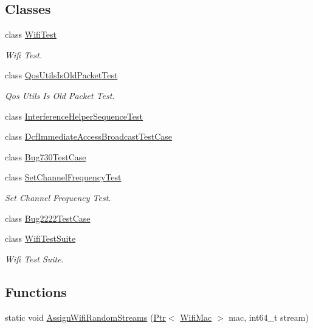 \subsection*{Classes}
\begin{DoxyCompactItemize}
\item 
class \hyperlink{classWifiTest}{Wifi\+Test}
\begin{DoxyCompactList}\small\item\em Wifi Test. \end{DoxyCompactList}\item 
class \hyperlink{classQosUtilsIsOldPacketTest}{Qos\+Utils\+Is\+Old\+Packet\+Test}
\begin{DoxyCompactList}\small\item\em Qos Utils Is Old Packet Test. \end{DoxyCompactList}\item 
class \hyperlink{classInterferenceHelperSequenceTest}{Interference\+Helper\+Sequence\+Test}
\item 
class \hyperlink{classDcfImmediateAccessBroadcastTestCase}{Dcf\+Immediate\+Access\+Broadcast\+Test\+Case}
\item 
class \hyperlink{classBug730TestCase}{Bug730\+Test\+Case}
\item 
class \hyperlink{classSetChannelFrequencyTest}{Set\+Channel\+Frequency\+Test}
\begin{DoxyCompactList}\small\item\em Set Channel Frequency Test. \end{DoxyCompactList}\item 
class \hyperlink{classBug2222TestCase}{Bug2222\+Test\+Case}
\item 
class \hyperlink{classWifiTestSuite}{Wifi\+Test\+Suite}
\begin{DoxyCompactList}\small\item\em Wifi Test Suite. \end{DoxyCompactList}\end{DoxyCompactItemize}
\subsection*{Functions}
\begin{DoxyCompactItemize}
\item 
static void \hyperlink{wifi-test_8cc_a27e1dfc9840ff9d220527fa04cbd65de}{Assign\+Wifi\+Random\+Streams} (\hyperlink{classns3_1_1Ptr}{Ptr}$<$ \hyperlink{classns3_1_1WifiMac}{Wifi\+Mac} $>$ mac, int64\+\_\+t stream)
\end{DoxyCompactItemize}
